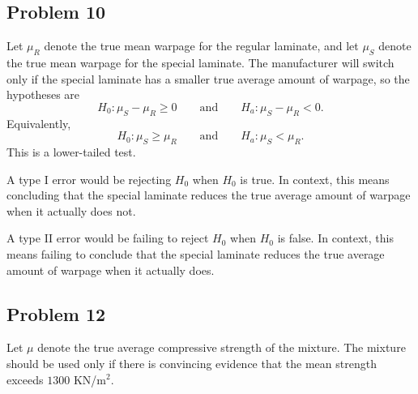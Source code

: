 \documentclass[11pt]{article}
\begin{document}
\subsection*{Problem 10}

Let $\mu_R$ denote the true mean warpage for the regular laminate, and let $\mu_S$ denote the true mean warpage for the special laminate. The manufacturer will switch only if the special laminate has a smaller true average amount of warpage, so the hypotheses are
\[
H_0:\mu_S-\mu_R \ge 0
\qquad \text{and} \qquad
H_a:\mu_S-\mu_R<0.
\]
Equivalently,
\[
H_0:\mu_S\ge \mu_R
\qquad \text{and} \qquad
H_a:\mu_S<\mu_R.
\]
This is a lower-tailed test.

A type I error would be rejecting $H_0$ when $H_0$ is true. In context, this means concluding that the special laminate reduces the true average amount of warpage when it actually does not.

A type II error would be failing to reject $H_0$ when $H_0$ is false. In context, this means failing to conclude that the special laminate reduces the true average amount of warpage when it actually does.

\subsection*{Problem 12}

Let $\mu$ denote the true average compressive strength of the mixture. The mixture should be used only if there is convincing evidence that the mean strength exceeds $1300$ KN/m$^2$.
\end{document}
